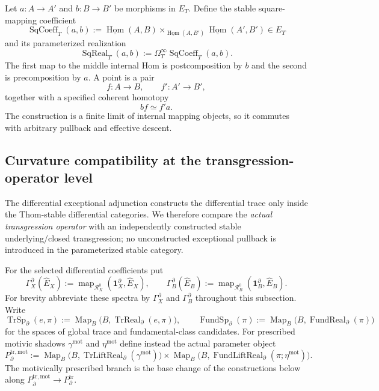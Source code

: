 \begin{construction}
\label{constr:prequantum-square-realization}
Let $a:A\to A'$ and $b:B\to B'$ be morphisms in $E_T$.  Define the stable
square-mapping coefficient
\[
\operatorname{SqCoeff}_T(a,b)
:=
\underline{\operatorname{Hom}}(A,B)
\times_{\underline{\operatorname{Hom}}(A,B')}
\underline{\operatorname{Hom}}(A',B')
\in E_T
\]
and its parameterized realization
\[
\boxed{
\operatorname{SqReal}_T(a,b)
:=
\Omega_T^\infty\operatorname{SqCoeff}_T(a,b).
}
\]
The first map to the middle internal Hom is postcomposition by $b$ and the
second is precomposition by $a$.  A point is a pair
\[
f:A\to B,
\qquad
f':A'\to B',
\]
together with a specified coherent homotopy
\[
bf\simeq f'a.
\]
The construction is a finite limit of internal mapping objects, so it commutes
with arbitrary pullback and effective descent.
\end{construction}

\subsection{Curvature compatibility at the transgression-operator level}
\label{subsec:prequantum-transgression-operator-curvature}

The differential exceptional adjunction constructs the differential trace only
inside the Thom-stable differential categories.  We therefore compare the
\emph{actual transgression operator} with an independently constructed stable
underlying/closed transgression; no unconstructed exceptional pullback is
introduced in the parameterized stable category.

For the selected differential coefficients put
\[
\Gamma_X^{\partial}(\widehat E_X)
:=
\operatorname{map}_{\mathcal R_X^0}
(\mathbf1_X^{\partial},\widehat E_X),
\qquad
\Gamma_B^{\partial}(\widehat E_B)
:=
\operatorname{map}_{\mathcal R_B^0}
(\mathbf1_B^{\partial},\widehat E_B).
\]
For brevity abbreviate these spectra by $\Gamma_X^{\partial}$ and
$\Gamma_B^{\partial}$ throughout this subsection.  Write
\[
\operatorname{TrSp}_{\partial}(e,\pi)
:=
\operatorname{Map}_B
\bigl(B,\operatorname{TrReal}_{\partial}(e,\pi)\bigr),
\qquad
\operatorname{FundSp}_{\partial}(\pi)
:=
\operatorname{Map}_B
\bigl(B,\operatorname{FundReal}_{\partial}(\pi)\bigr)
\]
for the spaces of global trace and fundamental-class candidates.  For prescribed
motivic shadows $\gamma^{\mathrm{mot}}$ and $\eta^{\mathrm{mot}}$ define instead
the actual parameter object
\[
\boxed{
P_{\partial}^{\mathrm{tr,mot}}
:=
\operatorname{Map}_B
\bigl(B,\operatorname{TrLiftReal}_{\partial}(\gamma^{\mathrm{mot}})\bigr)
\times
\operatorname{Map}_B
\bigl(B,\operatorname{FundLiftReal}_{\partial}
(\pi;\eta^{\mathrm{mot}})\bigr).
}
\]
The motivically prescribed branch is the base change of the constructions below
along $P_{\partial}^{\mathrm{tr,mot}}\to P_{\partial}^{\mathrm{tr}}$.

